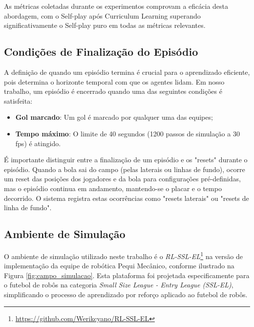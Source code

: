 As métricas coletadas durante os experimentos comprovam a eficácia desta abordagem, com o Self-play após Curriculum Learning superando significativamente o Self-play puro em todas as métricas relevantes.

\subsection{Condições de Finalização do Episódio}

A definição de quando um episódio termina é crucial para o aprendizado eficiente, pois determina o horizonte temporal com que os agentes lidam. Em nosso trabalho, um episódio é encerrado quando uma das seguintes condições é satisfeita:

\begin{itemize}
    \item \textbf{Gol marcado}: Um gol é marcado por qualquer uma das equipes;
    \item \textbf{Tempo máximo}: O limite de 40 segundos (1200 passos de simulação a 30 fps) é atingido.
\end{itemize}

É importante distinguir entre a finalização de um episódio e os "resets" durante o episódio. Quando a bola sai do campo (pelas laterais ou linhas de fundo), ocorre um reset das posições dos jogadores e da bola para configurações pré-definidas, mas o episódio continua em andamento, mantendo-se o placar e o tempo decorrido. O sistema registra estas ocorrências como "resets laterais" ou "resets de linha de fundo".

\subsection{Ambiente de Simulação}

O ambiente de simulação utilizado neste trabalho é o \textit{RL-SSL-EL}\footnote{\url{https://github.com/Werikcyano/RL-SSL-EL}} na versão de implementação da equipe de robótica Pequi Mecânico, conforme ilustrado na Figura \ref{fig:campo_simulacao}. Esta plataforma foi projetada especificamente para o futebol de robôs na categoria \textit{Small Size League - Entry League (SSL-EL)}, simplificando o processo de aprendizado por reforço aplicado ao futebol de robôs.


